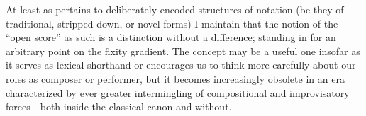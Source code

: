     At least as pertains to deliberately-encoded structures of notation (be they of traditional, stripped-down, or novel forms) I maintain that the notion of the ``open score'' as such is a distinction without a difference; standing in for an arbitrary point on the fixity gradient. The concept may be a useful one insofar as it serves as lexical shorthand or encourages us to think more carefully about our roles as composer or performer, but it becomes increasingly obsolete in an era characterized by ever greater intermingling of compositional and improvisatory forces---both inside the classical canon and without.



    





